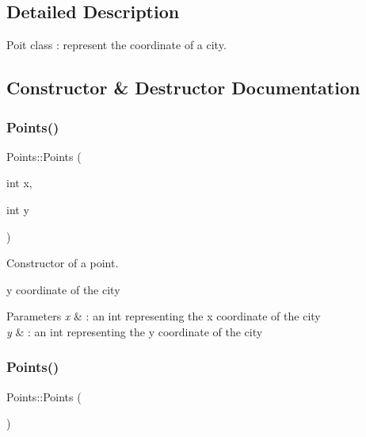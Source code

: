 \subsection{Detailed Description}
Poit class \+: represent the coordinate of a city. 

\subsection{Constructor \& Destructor Documentation}
\mbox{\label{class_points_a8465a6ce33ac38614004d8554a63cb25}} 
\subsubsection{\texorpdfstring{Points()}{Points()}\hspace{0.1cm}{\footnotesize\ttfamily [1/2]}}
{\footnotesize\ttfamily Points\+::\+Points (\begin{DoxyParamCaption}\item[{int}]{x,  }\item[{int}]{y }\end{DoxyParamCaption})}



Constructor of a point. 

y coordinate of the city


\begin{DoxyParams}{Parameters}
{\em x} & \+: an int representing the x coordinate of the city \\
\hline
{\em y} & \+: an int representing the y coordinate of the city \\
\hline
\end{DoxyParams}
\mbox{\label{class_points_aa4e68083d98bd04233c9753dfe1e46ab}} 
\subsubsection{\texorpdfstring{Points()}{Points()}\hspace{0.1cm}{\footnotesize\ttfamily [2/2]}}
{\footnotesize\ttfamily Points\+::\+Points (\begin{DoxyParamCaption}{ }\end{DoxyParamCaption})}



